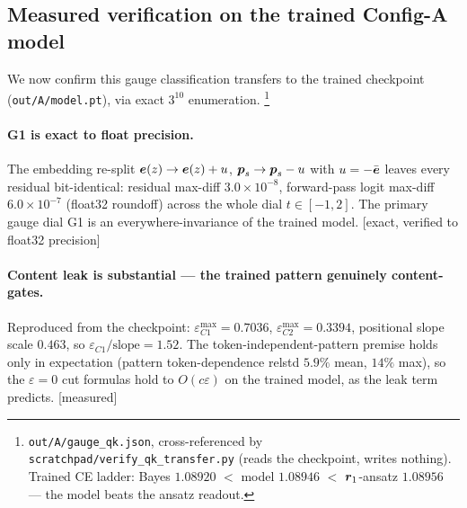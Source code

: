 \documentclass{article}
\newcommand{\htag}[1]{{\normalfont\sffamily\footnotesize[#1]}}
\begin{document}
\subsection{Measured verification on the trained Config-A model}\label{sec:qkmeas}

We now confirm this gauge classification transfers to the trained checkpoint
(\texttt{out/A/model.pt}), via exact $3^{10}$ enumeration.%
\footnote{\texttt{out/A/gauge\_qk.json}, cross-referenced by
\texttt{scratchpad/verify\_qk\_transfer.py} (reads the checkpoint, writes nothing).
Trained CE ladder: Bayes $1.08920$ $<$ model $1.08946$ $<$ $\boldsymbol{r}_1$-ansatz $1.08956$
--- the model beats the ansatz readout.}

\paragraph{G1 is exact to float precision.} The embedding re-split
$\boldsymbol{e}(z)\to\boldsymbol{e}(z)+u$, $\boldsymbol{p}_s\to\boldsymbol{p}_s-u$ with $u=-\bar{\boldsymbol{e}}$ leaves every residual
bit-identical: residual max-diff $3.0\times10^{-8}$, forward-pass logit max-diff
$6.0\times10^{-7}$ (float32 roundoff) across the whole dial $t\in[-1,2]$. The primary
gauge dial G1 is an everywhere-invariance of the trained model. \htag{exact,
verified to float32 precision}

\paragraph{Content leak is substantial --- the trained pattern genuinely
content-gates.} Reproduced from the checkpoint: $\varepsilon_{C1}^{\max}=0.7036$,
$\varepsilon_{C2}^{\max}=0.3394$, positional slope scale $0.463$, so
$\varepsilon_{C1}/\text{slope}=1.52$. The token-independent-pattern premise holds
only in expectation (pattern token-dependence relstd $5.9\%$ mean, $14\%$ max), so
the $\varepsilon=0$ cut formulas hold to $O(c\varepsilon)$ on the trained model, as
the leak term predicts. \htag{measured}
\end{document}
